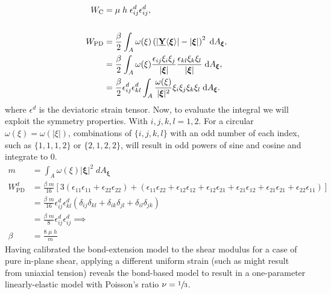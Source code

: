 %
\begin{align*}
    W_\text{C} &= \mu \; h \; \epsilon_{ij}^d \epsilon_{ij}^d,  \\  \\
    W_\text{PD} &= \frac{\beta}{2}\int_A \omega(\xi)\left(|\vstate{Y}{}{\boldsymbol{\xi}}|-|\boldsymbol{\xi}|\right)^2 \; {\rm d}A_{\boldsymbol{\xi}}, \\
    &=\frac{\beta}{2}\int_A  \omega(\xi) \frac{\epsilon_{ij}\xi_i \xi_j }{|\boldsymbol{\xi}|} \frac{\epsilon_{kl} \xi_k \xi_l }{|\boldsymbol{\xi}|}\;{\rm d}A_{\boldsymbol{\xi}},\\
    &=\frac{\beta}{2} \epsilon_{ij}^d \epsilon_{kl}^d \int_A \frac{ \omega(\xi)}{|\boldsymbol{\xi}|^2}\xi_i \xi_j \xi_k \xi_l \;{\rm d}A_{\boldsymbol{\xi}}.
\end{align*}
%
where $\epsilon^d$ is the deviatoric strain tensor.  Now, to evaluate the integral we will exploit the symmetry properties. With $i, j, k, l = 1,2$. For a circular $\omega(\xi) = \omega(|\xi|)$, combinations of $\{i,j,k,l\}$ with an odd number of each index, such as $\{1,1,1,2\}$ or $\{2,1,2,2\}$, will result in odd powers of sine and cosine and integrate to 0.
%
\begin{align*}
    m &= \int_A \omega(\xi)|\boldsymbol{\xi}|^2\; dA_{\boldsymbol{\xi}} \\
    W^d_\text{PD} &= \frac{\beta \; m}{16}[3(\epsilon_{11}\epsilon_{11}+\epsilon_{22}\epsilon_{22})+(\epsilon_{11}\epsilon_{22}+\epsilon_{12}\epsilon_{12}+\epsilon_{12}\epsilon_{21}+\epsilon_{21}\epsilon_{12}+\epsilon_{21}\epsilon_{21}+\epsilon_{22}\epsilon_{11})]\\
    &= \frac{\beta \; m}{16} \epsilon_{ij}^d \epsilon_{kl}^d (\delta_{ij}\delta_{kl}+\delta_{ik}\delta_{jl}+\delta_{il}\delta_{jk})\\
    &= \frac{\beta \; m}{8} \epsilon_{ij}^d \epsilon_{ij}^d \implies\\
     \beta &= \frac{8 \; \mu\;h}{m}
\end{align*}
%
Having calibrated the bond-extension model to the shear modulus for a case of pure in-plane shear, applying a different uniform strain (such as might result from uniaxial tension) reveals the bond-based model to result in a one-parameter linearly-elastic model with Poisson's ratio \(\nu=\sfrac{1}{3}\).  

